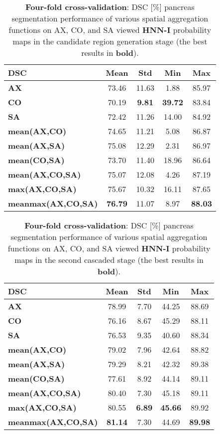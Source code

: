 \documentclass[journal]{IEEEtran}
\begin{document}
\begin{table}[htb]
\centering
\caption{\small  \textbf{Four-fold cross-validation}: DSC [\%] pancreas segmentation performance of various spatial aggregation functions on AX, CO, and SA viewed \textbf{HNN-I} probability maps in the candidate region generation stage (the best results in \textbf{bold}).}    
    \begin{tabular}{l|c|c|c|c}
	\toprule
	\toprule
\textbf{DSC} &	\textbf{Mean} & \textbf{Std} & \textbf{Min} & \textbf{Max} \\
	\midrule       
\textbf{AX} &	73.46 &	11.63 &	1.88 &	85.97 \\
\textbf{CO} &	70.19 &	\textbf{9.81} &	\textbf{39.72} &	83.84 \\
\textbf{SA} &	72.42 &	11.26 &	14.00 &	84.92 \\
\textbf{mean(AX,CO)} &	74.65 &	11.21 &	5.08 &	86.87 \\ 
\textbf{mean(AX,SA)} &	75.08 &	12.29 &	2.31 &	86.97 \\
\textbf{mean(CO,SA)} &     73.70 &       11.40 &      18.96 & 86.64 \\
\textbf{mean(AX,CO,SA)} &	75.07 &	12.08 &	4.26 &	87.19 \\
\textbf{max(AX,CO,SA)} &	75.67 &	10.32 &	16.11 &	87.65 \\
\textbf{meanmax(AX,CO,SA)} & \textbf{76.79} & 11.07  & 8.97 & \textbf{88.03} \\
    	\bottomrule
	\bottomrule
    \end{tabular}%
		 \label{tab:candidate_bb}
\end{table}
\begin{table}[htb]
\centering
\caption{\small  \textbf{Four-fold cross-validation}: DSC [\%] pancreas segmentation performance of various spatial aggregation functions on AX, CO, and SA viewed \textbf{HNN-I} probability maps in the second cascaded stage (the best results in \textbf{bold}).}
\begin{tabular}{l|c|c|c|c}
\toprule
\toprule
\textbf{DSC} &	\textbf{Mean} & \textbf{Std} & \textbf{Min} & \textbf{Max} \\
\midrule       
\textbf{AX} 					  & 78.99 & 7.70  & 44.25 & 88.69\\
\textbf{CO} 					  & 76.16 & 8.67  & 45.29 & 88.11\\
\textbf{SA} 					  & 76.53 & 9.35  & 40.60 & 88.34\\
\textbf{mean(AX,CO)} 				  & 79.02 & 7.96  & 42.64 & 88.82\\
\textbf{mean(AX,SA)}				  & 79.29 & 8.21  & 42.32 & 89.38\\ 
\textbf{mean(CO,SA)}                               & 77.61 & 8.92  & 44.14 & 89.11\\
\textbf{mean(AX,CO,SA)}                       & 80.40 & 7.30  & 45.18 & 89.11\\
\textbf{max(AX,CO,SA)}               & 80.55 & \textbf{6.89}  & \textbf{45.66} & 89.92\\
\textbf{meanmax(AX,CO,SA)} & \textbf{81.14} & 7.30  & 44.69 & \textbf{89.98}\\
    	\bottomrule
	\bottomrule
    \end{tabular}%
		\label{tab:MV_aggregation}
\end{table}
\end{document}
